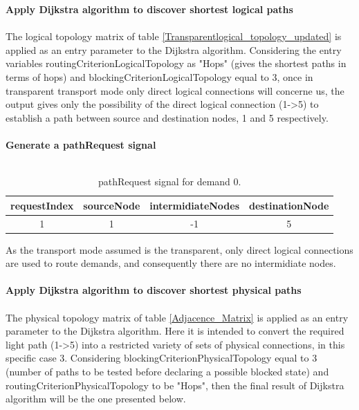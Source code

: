 \textbf{Apply Dijkstra algorithm to discover shortest logical paths}\\ \\

The logical topology matrix of table \ref{Transparentlogical_topology_updated} is applied as an entry parameter to the Dijkstra algorithm. Considering the entry variables routingCriterionLogicalTopology as "Hops" (gives the shortest paths in terms of hops) and blockingCriterionLogicalTopology equal to 3, once in transparent transport mode only direct logical connections will concerne us, the output gives only the possibility of the direct logical connection (1->5) to establish a path between source and destination nodes, 1 and 5 respectively.\\ \\

\textbf{Generate a pathRequest signal}\\ \\

\begin{table}[H]
	\centering
	\begin{tabular}{|c|c|c|c|}
		\hline
		requestIndex & sourceNode & intermidiateNodes & destinationNode \\ \hline
		1            & 1          & -1                 & 5               \\ \hline
	\end{tabular}
	\caption{pathRequest signal for demand 0.}
\end{table} 

As the transport mode assumed is the transparent, only direct logical connections are used to route demands, and consequently there are no intermidiate nodes.\\ \\

\textbf{Apply Dijkstra algorithm to discover shortest physical paths}\\ \\
The physical topology matrix of table \ref{Adjacence_Matrix} is applied as an entry parameter to the Dijkstra algorithm. Here it is intended to convert the required light path (1->5) into a restricted variety of sets of physical connections, in this specific case 3. Considering blockingCriterionPhysicalTopology equal to 3 (number of paths to be tested before declaring a possible blocked state) and routingCriterionPhysicalTopology to be "Hops", then the final result of Dijkstra algorithm will be the one presented below.



